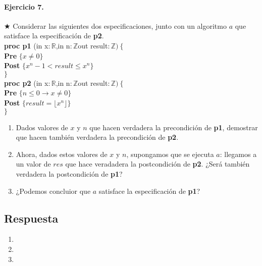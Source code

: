 \documentclass[a4paper]{article}
\begin{document}
\paragraph*{Ejercicio 7.}$\bigstar$ Considerar las siguientes dos especificaciones, junto con un algoritmo $a$ que satisface la especificación de \textbf{p2}.\medskip \\
		\textbf{proc p1 }(in x$: \mathbb{R}$,in n$: \mathbb{Z}$out result$:\mathbb{Z})\ \{$\smallskip \\
		\hspace*{6mm} \textbf{Pre }$\{x\neq 0\}$\smallskip \\
		\hspace*{6mm} \textbf{Post }$\{x^n-1<result\leq x^n\}$\\
		$\}$\medskip \\
		\textbf{proc p2 }(in x$: \mathbb{R}$,in n$: \mathbb{Z}$out result$:\mathbb{Z})\ \{$\smallskip \\
		\hspace*{6mm} \textbf{Pre }$\{ n\leq 0\rightarrow x\neq 0\}$\smallskip \\
		\hspace*{6mm} \textbf{Post }$\{result=\lfloor x^n\rfloor\}$\\
		$\}$
	\begin{enumerate}[label=\alph*)]
		\item Dados valores de $x$ y $n$ que hacen verdadera la precondición de \textbf{p1}, demostrar que hacen también verdadera la precondición de \textbf{p2}.
		\item Ahora, dados estos valores de $x$ y $n$, supongamos que se ejecuta $a$: llegamos a un valor de $res$ que hace veradadera la postcondición de \textbf{p2}. ¿Será también verdadera la postcondición de \textbf{p1}?
		\item ¿Podemos concluior que $a$ satisface la especificación de \textbf{p1}? 
	\end{enumerate}
\subsection*{Respuesta}
	\begin{enumerate}[label=\alph*)]
		\item
		\item
		\item
	\end{enumerate}
	
\end{document}

